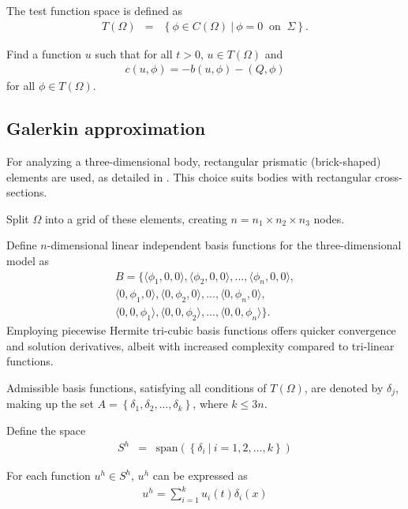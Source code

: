	The test function space is defined as
	\begin{eqnarray*}
		T(\Omega) & = & \left\{ \phi \in C(\Omega) \ | \ \phi = 0 \ \textrm{ on } \ \Sigma \right\}.
	\end{eqnarray*}

	Find a function $u$ such that for all $t>0$, $u \in T(\Omega)$ and 
	\begin{align}
		c(u,\phi) = -b(u,\phi) - (Q,\phi) \label{3DB_20}
	\end{align}
	for all $\phi \in T(\Omega)$.\\

	\subsection*{Galerkin approximation}
	For analyzing a three-dimensional body, rectangular prismatic (brick-shaped) elements are used, as detailed in \cite{Wu06}. This choice suits bodies with rectangular cross-sections.

	Split $\Omega$ into a grid of these elements, creating $n = n_1 \times n_2 \times n_3$ nodes.

	Define $n$-dimensional linear independent basis functions for the three-dimensional model as
	\begin{eqnarray*}
	B = \{\langle\phi_1, 0 , 0\rangle, \langle\phi_2, 0, 0\rangle,...,\langle\phi_{n}, 0, 0 \rangle,\\
		\langle 0,\phi_1 ,0 \rangle,\langle 0 ,\phi_2,0\rangle,...,\langle 0,\phi_{n},0\rangle,\\
		\langle 0,0,\phi_1 \rangle,\langle 0,0,\phi_2\rangle,...,\langle 0,0,\phi_{n}\rangle \}.
	\end{eqnarray*}
	Employing piecewise Hermite tri-cubic basis functions offers quicker convergence and solution derivatives, albeit with increased complexity compared to tri-linear functions.

	Admissible basis functions, satisfying all conditions of $T(\Omega)$, are denoted by $\delta_j$, making up the set $A = \left\{\delta_1, \delta_2,... , \delta_k\right\}$, where $k \leq 3n$.


	Define the space
	\begin{eqnarray*}
		S^h & = & \textrm{span}\left(\left\{\delta_i \ | \ i = 1,2,...,k \right\} \right)
	\end{eqnarray*}

	For each function $u^h \in S^h$, $u^h$ can be expressed as
	\begin{eqnarray*}
		u^h = \sum_{i = 1}^{k} u_i(t) \delta_{i}(x)
	\end{eqnarray*}

